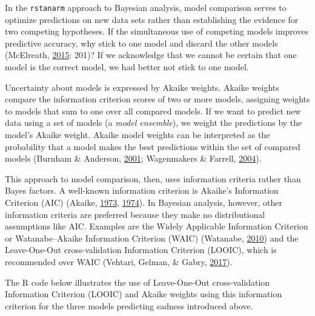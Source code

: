 \documentclass[
  english,
  doc]{apa6}
\begin{document}
In the \texttt{rstanarm} approach to Bayesian analysis, model comparison serves to optimize predictions on new data sets rather than establishing the evidence for two competing hypotheses. If the simultaneous use of competing models improves predictive accuracy, why stick to one model and discard the other models (McElreath, \protect\hyperlink{ref-McElreathStatisticalRethinkingBayesian2015}{2015}: 201)? If we acknowledge that we cannot be certain that one model is the correct model, we had better not stick to one model.

Uncertainty about models is expressed by Akaike weights. Akaike weights compare the information criterion scores of two or more models, assigning weights to models that sum to one over all compared models. If we want to predict new data using a set of models (a \emph{model ensemble}), we weight the predictions by the model's Akaike weight. Akaike model weights can be interpreted as the probability that a model makes the best predictions within the set of compared models (Burnham \& Anderson, \protect\hyperlink{ref-BurnhamKullbackLeiblerinformationbasis2001}{2001}; Wagenmakers \& Farrell, \protect\hyperlink{ref-WagenmakersAICmodelselection2004}{2004}).

This approach to model comparison, then, uses information criteria rather than Bayes factors. A well-known information criterion is Akaike's Information Criterion (AIC) (Akaike, \protect\hyperlink{ref-AkaikeInformationtheoryextension1973}{1973}, \protect\hyperlink{ref-akaikeNewLookStatistical1974}{1974}). In Bayesian analysis, however, other information criteria are preferred because they make no distributional assumptions like AIC. Examples are the Widely Applicable Information Criterion or Watanabe--Akaike Information Criterion (WAIC) (Watanabe, \protect\hyperlink{ref-WatanabeAsymptoticEquivalenceBayes2010}{2010}) and the Leave-One-Out cross-validation Information Criterion (LOOIC), which is recommended over WAIC (Vehtari, Gelman, \& Gabry, \protect\hyperlink{ref-Vehtari2017}{2017}).

The R code below illustrates the use of Leave-One-Out cross-validation Information Criterion (LOOIC) and Akaike weights using this information criterion for the three models predicting sadness introduced above.
\end{document}
